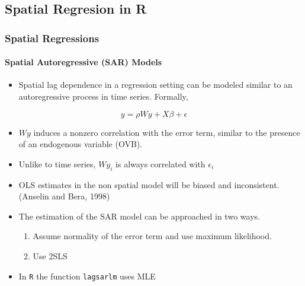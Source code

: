 \documentclass[
  shownotes,
  xcolor={svgnames},
  hyperref={colorlinks,citecolor=DarkBlue,linkcolor=DarkRed,urlcolor=DarkBlue}
   , aspectratio=169]{beamer}
\begin{document}
\subsection{Spatial Regresion in R}
\begin{frame}[fragile]
\frametitle{Spatial Regressions }
\framesubtitle{Spatial Autoregressive (SAR) Models}

\begin{itemize}
\item Spatial lag dependence in a regression setting can be modeled similar to
an autoregressive process in time series. Formally,
\end{itemize}


\[ y= \rho Wy+ X \beta + \epsilon \]

\begin{itemize}
  \footnotesize
\item \(Wy\) induces a nonzero correlation with the error term, similar to the presence of an endogenous variable (OVB).

\item  Unlike to time series, \(Wy_i\) is always correlated with \(\epsilon_i\) 

\item OLS estimates in the non spatial model will be biased and inconsistent. (Anselin and Bera, 1998)

\item The estimation of the SAR model can be approached in two ways.
\begin{enumerate}
  \tiny
  \item Assume normality of the error term and use maximum likelihood.
  \item Use 2SLS
\end{enumerate}
\item In \texttt{R}  the function \texttt{lagsarlm} uses MLE
\end{itemize}


\end{frame}
\end{document}
